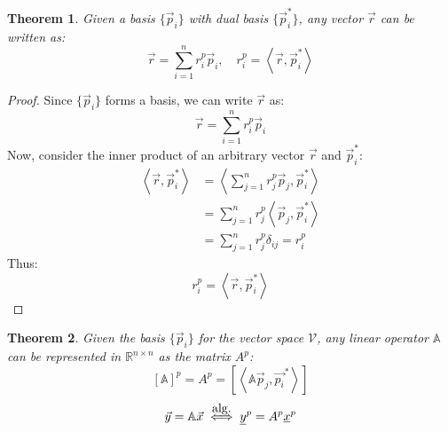\documentclass{article}
\newtheorem{theorem}{Theorem}
\begin{document}
\newcommand{\q}{\vec}
\newcommand{\aq}{\underline}
\newcommand{\qs}[1]{\vec{#1}^*}
\newcommand{\nsum}[1]{\sum_{#1=1}^n}
\newcommand\algeq{\stackrel{\mathclap{\normalfont\mbox{alg.}}}{\iff}}



\begin{theorem}
    Given a basis $\{\q{p}_i\}$ with dual basis $\{\qs{p}_i\}$, any vector $\q{r}$ can be written as:
    $$\vec{r} = \sum_{i=1}^n r_i^p\q{p}_i, \quad r_i^p = \left<\q{r}, \qs{p}_i\right>$$
\end{theorem}
\begin{proof}
    Since $\{\q{p}_i\}$ forms a basis, we can write $\q{r}$ as:
    $$\q{r} = \sum_{i=1}^nr_i^p\q{p}_i$$
    Now, consider the inner product of an arbitrary vector $\q{r}$ and $\qs{p}_i$:
    \begin{align*}
        \left<\q{r}, \qs{p}_i\right> &= \left<\sum_{j=1}^nr_j^p\q{p}_j, \qs{p}_i\right>  \\
        &= \sum_{j=1}^nr_j^p\left<\q{p}_j, \qs{p}_i \right> \\
        &= \nsum{j}r_j^p \delta_{ij} = r_i^p
    \end{align*}
    Thus:
    \begin{equation*}
        r_i^p = \left<\q{r}, \qs{p}_i\right>
    \end{equation*}
\end{proof}

\begin{theorem}
Given the basis $\{\q{p}_i\}$ for the vector space $\mathcal{V}$, any linear operator
$\mathbb{A}$ can be represented in $\mathbb{R}^{n\times n}$ as the matrix $A^p$:
$$[\mathbb{A}]^p = A^p = \left[\left<\mathbb{A}\q{p}_j, \qs{p_i}\right>\right]$$
$$\q{y} = \mathbb{A}\q{x} \algeq \aq{y}^p = A^p\aq{x}^p$$
\end{theorem}
\end{document}
